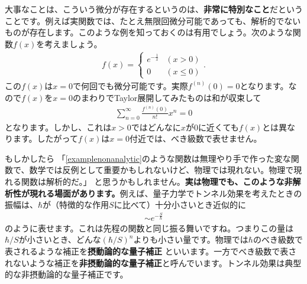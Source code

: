 \documentclass[report,paper=a4, fontsize=12pt, line_length=16cm, number_of_lines=33,dvipdfmx]{jlreq}
\numberwithin{equation}{section}
\newcommand{\strong}[1]{\textsf{\bfseries #1}}
\begin{document}
大事なことは、こういう微分が存在するというのは、\strong{非常に特別なこと}だということです。例えば実関数では、たとえ無限回微分可能であっても、解析的でないものが存在します。このような例を知っておくのは有用でしょう。次のような関数$f(x)$を考えましょう。
\begin{align}
  f(x)=
  \begin{cases}
    e^{-\frac{1}{x}}& (x>0)\\
    0&(x\le 0)
  \end{cases}.\label{examplenonanalytic}
\end{align}
この$f(x)$は$x=0$で何回でも微分可能です。実際$f^{(n)}(0)=0$となります。なので$f(x)$を$x=0$のまわりでTaylor展開してみたものは和が収束して
\begin{align}
  \sum_{n=0}^{\infty}\frac{f^{(n)}(0)}{n!}x^n=0
\end{align}
となります。しかし、これは$x>0$ではどんなに$x$が$0$に近くても$f(x)$とは異なります。したがって$f(x)$は$x=0$付近では、べき級数で表せません。

もしかしたら
「\eqref{examplenonanalytic}のような関数は無理やり手で作った変な関数で、数学では反例として重要かもしれないけど、物理では現れない。物理で現れる関数は解析的だ。」
と思うかもしれません。\strong{実は物理でも、このような非解析性が現れる場面があります。}例えば、量子力学でトンネル効果を考えたときの振幅は、$\hbar$が（特徴的な作用$S$に比べて）十分小さいとき近似的に
\begin{align}
  \sim e^{-\frac{S}{\hbar}}
\end{align}
のように表せます。これは先程の関数と同じ振る舞いですね。つまりこの量は$\hbar/S$が小さいとき、どんな$(\hbar/S)^n$よりも小さい量です。物理では$\hbar$のべき級数で表されるような補正を\strong{摂動論的な量子補正}
といいます。一方でべき級数で表されないような補正を\strong{非摂動論的な量子補正}と呼んでいます。トンネル効果は典型的な非摂動論的な量子補正です。
\end{document}
